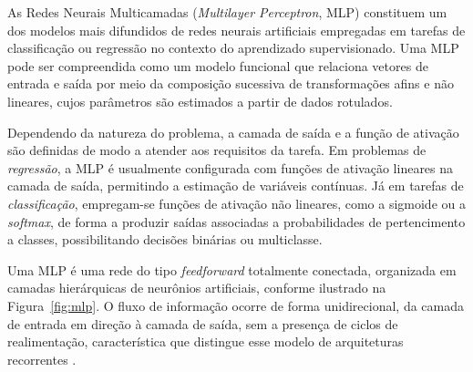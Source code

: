 %
%
%

As Redes Neurais Multicamadas (\emph{Multilayer Perceptron}, MLP) constituem um dos
modelos mais difundidos de redes neurais artificiais empregadas em tarefas de
classificação ou regressão no contexto do aprendizado supervisionado. Uma MLP pode
ser compreendida como um modelo funcional que relaciona vetores de entrada e
saída por meio da composição sucessiva de transformações afins e não lineares,
cujos parâmetros são estimados a partir de dados rotulados.

Dependendo da natureza do problema, a camada de saída e a função de ativação são
definidas de modo a atender aos requisitos da tarefa. Em problemas de
\textit{regressão}, a MLP é usualmente configurada com funções de ativação lineares
na camada de saída, permitindo a estimação de variáveis contínuas. Já em tarefas
de \textit{classificação}, empregam-se funções de ativação não lineares, como a
sigmoide ou a \textit{softmax}, de forma a produzir saídas associadas a
probabilidades de pertencimento a classes, possibilitando decisões binárias ou
multiclasse.

Uma MLP é uma rede do tipo \emph{feedforward} totalmente conectada, organizada em
camadas hierárquicas de neurônios artificiais, conforme ilustrado na
Figura~\ref{fig:mlp}. O fluxo de informação ocorre de forma unidirecional, da
camada de entrada em direção à camada de saída, sem a presença de ciclos de
realimentação, característica que distingue esse modelo de arquiteturas
recorrentes .


